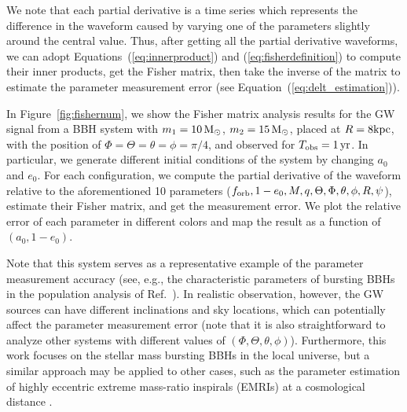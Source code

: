 \documentclass[%
 reprint,
 amsmath,amssymb,
 aps,
]{revtex4-2}
\begin{document}
We note that each partial derivative is a time series which represents the difference in the waveform caused by varying one of the parameters slightly around the central value. Thus, after getting all the partial derivative waveforms, we can adopt Equations~(\ref{eq:innerproduct}) and (\ref{eq:fisherdefinition}) to compute their inner products, get the Fisher matrix, then take the inverse of the matrix to estimate the parameter measurement error (see Equation~(\ref{eq:delt_estimation})).



In Figure~\ref{fig:fishernum}, we show the Fisher matrix analysis results for the GW signal from a BBH system with $m_1=10\, {\rm M_{\odot}}$, $m_2=15\, {\rm M_{\odot}}$, placed at $R=8\rm kpc$, with the position of $\Phi=\Theta=\theta=\phi=\pi/4$, and observed for $T_{\rm obs}= 1\, \rm yr$. In particular, we generate different initial conditions of the system by changing $a_0$ and $e_0$. For each configuration, we compute the partial derivative of the waveform relative to the aforementioned 10 parameters ($f_{\rm orb}, 1-e_0, M, q, \Theta, \Phi, \theta,\phi, R,\psi$), estimate their Fisher matrix, and get the measurement error. We plot the relative error of each parameter in different colors and map the result as a function of $(a_0,1-e_0)$.

Note that this system serves as a representative example of the parameter measurement accuracy (see, e.g., the characteristic parameters of bursting BBHs in the population analysis of Ref.~\citep{Xuan+23b}). In realistic observation, however, the GW sources can have different inclinations and sky locations, which can potentially affect the parameter measurement error (note that it is also straightforward to analyze other systems with different values of $(\Phi,\Theta,\theta,\phi)$). Furthermore, this work focuses on the stellar mass bursting BBHs in the local universe, but a similar approach may be applied to other cases, such as the parameter estimation of highly eccentric extreme mass-ratio inspirals (EMRIs) at a cosmological distance \citep[see, e.g.,][]{Rubbo06,Yunes_2008EMRIburst,Berry_2013,Han+20EMRIburst,oliver2023gravitational,Fan22,Naoz+23}. 
\end{document}
